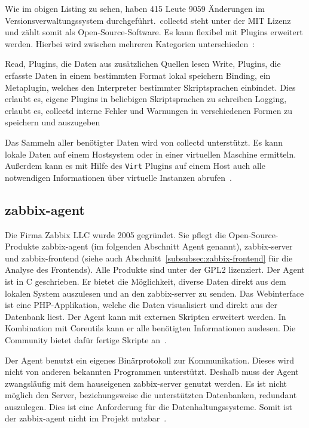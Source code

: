 

Wie im obigen Listing zu sehen, haben 415 Leute 9059 Änderungen im
Versionsverwaltungssystem durchgeführt.\ collectd steht unter der MIT Lizenz
und zählt somit als Open-Source-Software. Es kann flexibel mit Plugins
erweitert werden. Hierbei wird zwischen mehreren Kategorien
unterschieden~\cite{collectd_plugins}:

\begin{outline}
  \1 Read, Plugins, die Daten aus zusätzlichen Quellen lesen
  \1 Write, Plugins, die erfasste Daten in einem bestimmten Format lokal
  speichern
  \1 Binding, ein Metaplugin, welches den Interpreter bestimmter Skriptsprachen
  einbindet. Dies erlaubt es, eigene Plugins in beliebigen Skriptsprachen zu
  schreiben
  \1 Logging, erlaubt es, collectd interne Fehler und Warnungen in verschiedenen
  Formen zu speichern und auszugeben
\end{outline}

Das Sammeln aller benötigter Daten wird von collectd unterstützt. Es kann
lokale Daten auf einem Hostsystem oder in einer virtuellen Maschine ermitteln.
Außerdem kann es mit Hilfe des \texttt{Virt} Plugins auf einem Host auch alle
notwendigen Informationen über virtuelle Instanzen
abrufen~\cite{collectd_virt_plugins}.
\tm%

\subsection{zabbix-agent}
Die Firma Zabbix LLC wurde 2005 gegründet. Sie pflegt die Open-Source-Produkte
zabbix-agent (im folgenden Abschnitt Agent genannt), zabbix-server und
zabbix-frontend (siehe auch Abschnitt~\ref{subsubsec:zabbix-frontend} für die
Analyse des Frontends). Alle Produkte sind unter der GPL2 lizenziert. Der Agent
ist in C geschrieben. Er bietet die Möglichkeit, diverse Daten direkt aus dem
lokalen System auszulesen und an den zabbix-server zu senden. Das Webinterface
ist eine PHP-Applikation, welche die Daten visualisiert und direkt aus der
Datenbank liest. Der Agent kann mit externen Skripten erweitert werden. In
Kombination mit Coreutils kann er alle benötigten Informationen auslesen. Die
Community bietet dafür fertige Skripte an~\cite{zabbix_virt_plugins}.

Der Agent benutzt ein eigenes Binärprotokoll zur Kommunikation. Dieses wird
nicht von anderen bekannten Programmen unterstützt. Deshalb muss der Agent
zwangsläufig mit dem hauseigenen zabbix-server genutzt werden. Es ist nicht
möglich den Server, beziehungsweise die unterstützten Datenbanken, redundant
auszulegen. Dies ist eine Anforderung für die Datenhaltungssysteme. Somit
ist der zabbix-agent nicht im Projekt nutzbar~\cite{zabbix_architecture}.
\tm%

